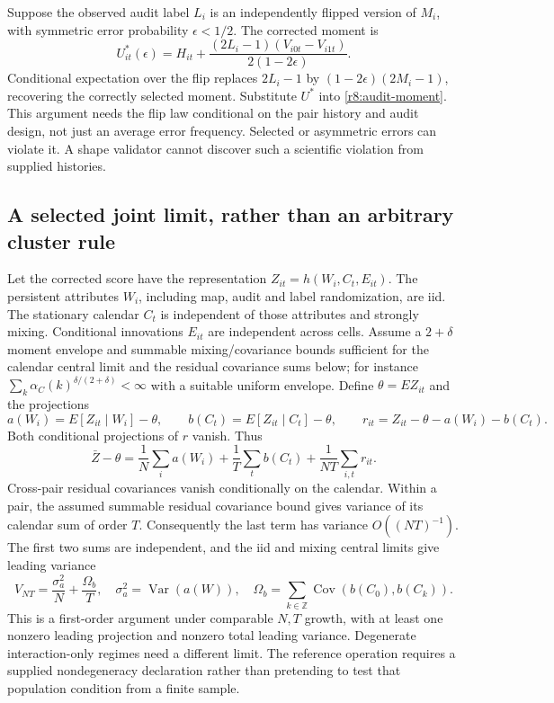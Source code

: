 Suppose the observed audit label $L_i$ is an independently flipped version of
$M_i$, with symmetric error probability $\epsilon<1/2$. The corrected moment is
\begin{equation}
 U^*_{it}(\epsilon)=H_{it}
  +\frac{(2L_i-1)(V_{i0t}-V_{i1t})}{2(1-2\epsilon)}.
 \label{r8:label-correction}
\end{equation}
Conditional expectation over the flip replaces $2L_i-1$ by
$(1-2\epsilon)(2M_i-1)$, recovering the correctly selected moment. Substitute
$U^*$ into \eqref{r8:audit-moment}. This argument needs the flip law conditional
on the pair history and audit design, not just an average error frequency.
Selected or asymmetric errors can violate it. A shape validator cannot discover
such a scientific violation from supplied histories.

\subsection{A selected joint limit, rather than an arbitrary cluster rule}

Let the corrected score have the representation
$Z_{it}=h(W_i,C_t,E_{it})$. The persistent attributes $W_i$, including map,
audit and label randomization, are iid. The stationary calendar $C_t$ is
independent of those attributes and strongly mixing. Conditional innovations
$E_{it}$ are independent across cells. Assume a $2+\delta$ moment envelope and
summable mixing/covariance bounds sufficient for the calendar central limit
and the residual covariance sums below; for instance
$\sum_k\alpha_C(k)^{\delta/(2+\delta)}<\infty$ with a suitable uniform envelope.
Define $\theta=EZ_{it}$ and the projections
\[
 a(W_i)=E[Z_{it}\mid W_i]-\theta,\qquad
 b(C_t)=E[Z_{it}\mid C_t]-\theta,\qquad
 r_{it}=Z_{it}-\theta-a(W_i)-b(C_t).
\]
Both conditional projections of $r$ vanish. Thus
\begin{equation}
 \bar Z-\theta=\frac1N\sum_i a(W_i)+\frac1T\sum_t b(C_t)
                  +\frac1{NT}\sum_{i,t}r_{it}.
 \label{r8:joint-projection}
\end{equation}
Cross-pair residual covariances vanish conditionally on the calendar. Within a
pair, the assumed summable residual covariance bound gives variance of its
calendar sum of order $T$. Consequently the last term has variance
$O((NT)^{-1})$. The first two sums are independent, and the iid and mixing
central limits give leading variance
\begin{equation}
 V_{NT}=\frac{\sigma_a^2}{N}+\frac{\Omega_b}{T},\quad
 \sigma_a^2=\operatorname{Var}(a(W)),\quad
 \Omega_b=\sum_{k\in\mathbb Z}\operatorname{Cov}(b(C_0),b(C_k)).
 \label{r8:joint-variance}
\end{equation}
This is a first-order argument under comparable $N,T$ growth, with at least one
nonzero leading projection and nonzero total leading variance. Degenerate
interaction-only regimes need a different limit. The reference operation
requires a supplied nondegeneracy declaration rather than pretending to test
that population condition from a finite sample.

